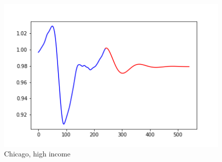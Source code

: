 \documentclass{article}
\begin{document}
\begin{figure}[ht]
\begin{minipage}[b]{0.3\linewidth}
\includegraphics[width=\textwidth]{Chicago_highinc_emp.png}
\caption{Chicago, high income}
\end{minipage}
\end{figure}
\end{document}
